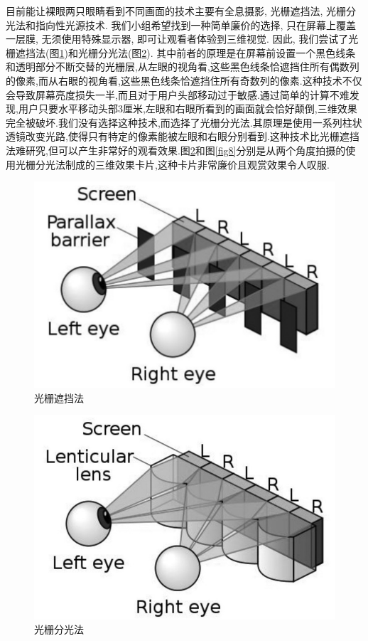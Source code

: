 \documentclass[a4paper, 11pt]{article}
\begin{document}
\begin{CJK}{UTF8}{gbsn}
目前能让裸眼两只眼睛看到不同画面的技术主要有全息摄影, 光栅遮挡法, 光栅分光法和指向性光源技术. 我们小组希望找到一种简单廉价的选择, 只在屏幕上覆盖一层膜, 无须使用特殊显示器, 即可让观看者体验到三维视觉. 因此, 我们尝试了光栅遮挡法(图\ref{fig6})和光栅分光法(图\ref{fig7}). 其中前者的原理是在屏幕前设置一个黑色线条和透明部分不断交替的光栅层,从左眼的视角看,这些黑色线条恰遮挡住所有偶数列的像素,而从右眼的视角看,这些黑色线条恰遮挡住所有奇数列的像素.这种技术不仅会导致屏幕亮度损失一半,而且对于用户头部移动过于敏感.通过简单的计算不难发现,用户只要水平移动头部3厘米,左眼和右眼所看到的画面就会恰好颠倒,三维效果完全被破坏.我们没有选择这种技术,而选择了光栅分光法.其原理是使用一系列柱状透镜改变光路,使得只有特定的像素能被左眼和右眼分别看到.这种技术比光栅遮挡法难研究,但可以产生非常好的观看效果.图\ref{fig7}和图\ref{fig8}分别是从两个角度拍摄的使用光栅分光法制成的三维效果卡片,这种卡片非常廉价且观赏效果令人叹服.
\begin{figure}[h!]
  \centerline{\includegraphics[width=\linewidth]{6.png}}
  \caption{光栅遮挡法}
  \label{fig6}
\end{figure}
\begin{figure}[h!]
  \centerline{\includegraphics[width=\linewidth]{7.png}}
  \caption{光栅分光法}
  \label{fig7}
\end{figure}


\end{CJK}
\end{document}
